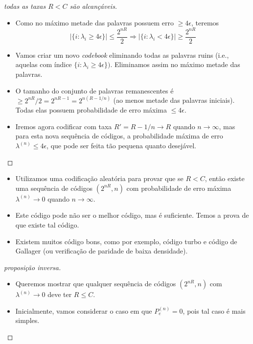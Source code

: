 \begin{frame}[allowframebreaks]
\begin{proof}[todas as taxas $R < C$ são alcançáveis]
  \proofbreak

  \begin{itemize}
  \item Como no máximo metade das palavras possuem erro $\geq 4\epsilon$, teremos
  \begin{equation}
  \vert \{i: \lambda_i \geq 4 \epsilon \} \vert \leq \frac{2^{nR}}{2} \Rightarrow \vert \{i: \lambda_i < 4 \epsilon \} \vert \geq \frac{2^{nR}}{2}
  \end{equation}
  \item Vamos criar um novo \textit{codebook} eliminando todas as palavras ruins 
	(i.e., aquelas com índice $\{i: \lambda_i \geq 4 \epsilon\})$. Eliminamos assim
	no máximo metade das palavras.
  \item O tamanho do conjunto de palavras remanescentes é $\geq 2^{nR}/2 = 2^{nR-1} = 2^{n(R-1/n)}$ 
	(ao menos metade das palavras iniciais). Todas elas possuem probabilidade de erro máxima $\leq 4\epsilon$.
  \end{itemize}

  \proofbreak
  \begin{itemize}
  \item Iremos agora codificar com taxa $R' = R-1/n \rightarrow R$ quando $n \rightarrow \infty$, mas
	para esta nova sequência de códigos, a probabilidade máxima de erro $\lambda^{(n)} \leq 4\epsilon$,
	que pode ser feita tão pequena quanto desejável.
  \end{itemize}
  \end{proof}

  \begin{itemize}
  \item Utilizamos uma codificação aleatória para provar que se $R<C$, então existe uma sequência de códigos $(2^{nR},n)$ 
  com probabilidade de erro máxima $\lambda^{(n)} \rightarrow 0$ quando $n \rightarrow \infty$.

  \item Este código pode não ser o melhor código, mas é suficiente. Temos a prova de que existe tal código.
 
  \item Existem muitos código bons, como por exemplo, código turbo e código de Gallager 
	(ou verificação de paridade de baixa densidade).
  \end{itemize}


  \framebreak

  \begin{proof}[proposição inversa]
  \begin{itemize}
  \item Queremos mostrar que qualquer sequência de códigos $(2^{nR},n)$ com $\lambda^{(n)} \rightarrow 0$ deve ter $R \leq C$.
  \item Inicialmente, vamos considerar o caso em que $P_e^{(n)} = 0$, pois tal caso é mais simples.
  \end{itemize}


\end{proof}
\end{frame}
